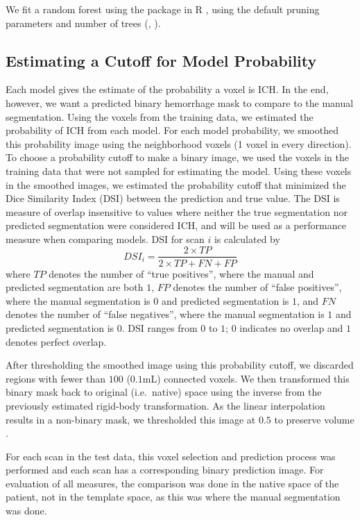 We fit a random forest \citep{breiman2001random} using the  package in R \citep{randomForest}, using the default pruning parameters and number of trees (, ). 



\subsection{Estimating a Cutoff for Model Probability}

Each model gives the estimate of the probability a voxel is ICH.  In the end, however, we want a predicted binary hemorrhage mask to compare to the manual segmentation. 
Using the voxels from the training data, we estimated the probability of ICH from each model.  For each model probability, we smoothed this probability image using the neighborhood voxels (1 voxel in every direction).  To choose a probability cutoff to make a binary image, we used the voxels in the training data that were not sampled for estimating the model.  Using these voxels in the smoothed images, we estimated the probability cutoff that minimized the Dice Similarity Index (DSI) \citep{dice_measures_1945} between the prediction and true value.  
 The DSI is measure of overlap insensitive to values where neither the true segmentation nor predicted segmentation were considered ICH, and will be used as a performance measure when comparing models.  DSI for scan $i$ is calculated by 
 $$
 DSI_i = \frac{2 \times TP}{2\times TP + FN + FP}
 $$
 where $TP$ denotes the number of ``true positives'', where the manual and predicted segmentation are both $1$, $FP$ denotes the number of ``false positives'', where the manual segmentation is $0$ and predicted segmentation is $1$, and $FN$ denotes the number of ``false negatives'', where the manual segmentation is $1$ and predicted segmentation is $0$.  DSI ranges from $0$ to $1$; $0$ indicates no overlap and $1$ denotes perfect overlap.

After thresholding the smoothed image using this probability cutoff, we discarded regions with fewer than $100$ ($0.1$mL) connected voxels.  We then transformed this binary mask back to original (i.e.~native) space using the inverse from the previously estimated rigid-body transformation.  As the linear interpolation results in a non-binary mask, we thresholded this image at $0.5$ to preserve volume \cite{flirt_reg}.  

For each scan in the test data, this voxel selection and prediction process was performed and each scan has a corresponding binary prediction  image.  For evaluation of all measures, the comparison was done in the native space of the patient, not in the template space, as this was where the manual segmentation was done.


